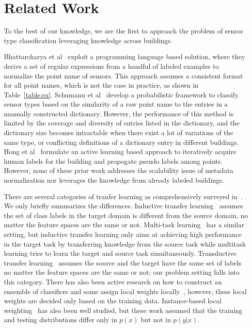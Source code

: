 \section{Related Work}
To the best of our knowledge, we are the first to approach the problem of sensor type classification leveraging knowledge across buildings.

Bhattarcharya et al~\cite{arka} exploit a programming language based solution, 
where they derive a set of regular expressions from a handful of labeled examples 
to normalize the point name of sensors. 
This approach assumes a consistent format for all point names, which is not the case in practice, as shown in Table~\ref{table:ex}. 
Schumann et al~\cite{ibm} develop a probabilistic framework to classify sensor types 
based on the similarity of a raw point name to the entries in a manually constructed dictionary. 
However, the performance of this method is limited by the coverage and diversity of entries listed in the dictionary, and the dictionary size becomes intractable when there exist a lot of variations of the same type, or conflicting definitions of a dictionary entry in different buildings.
Hong et al~\cite{cikm} formulate an active learning based approach to iteratively 
acquire human labels for the building and propogate pseudo labels among points.
However, none of these prior work addresses the scalability issue of metadata 
normalization nor leverages the knowledge from already labeled buildings.

There are several categories of tranfer learning as comprehensively surveyed in~\cite{transfer1}. We only briefly summarizes the differences. Inductive transfer learning~\cite{transfer2} assumes the set of class labels in the target domain is different from the source domain, no matter the feature spaces are the same or not. Multi-task learning~\cite{multitask} has a similar setting, but inductive transfer learning only aims at achieving high performance in the target task by transferring knowledge from the source task while multitask learning tries to learn the target and source task simultaneously. Transductive transfer learning~\cite{transfer3} assumes the source and the target have the same set of labels no matter the feature spaces are the same or not; our problem setting falls into this category. There has also been active research on how to construct an ensemble of classifiers and some assign local weights locally~\cite{ensem1,ensem2}, however, these local weights are decided only based on the training data.
Instance-based local weighting~\cite{weight1,weight2,weight3} has also been well studied, but these work assumed that the training and testing distributions differ only in $p(x)$ but not in $p(y|x)$.

